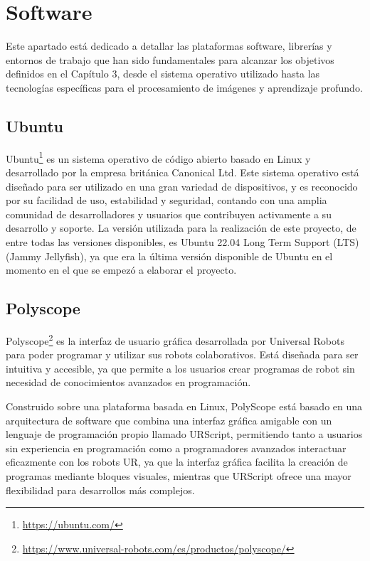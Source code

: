 \setcounter{footnote}{23} 

\section{Software}
\label{sec:software}

Este apartado está dedicado a detallar las plataformas software, librerías y entornos de trabajo que han sido fundamentales para alcanzar los objetivos definidos en el Capítulo 3, desde el sistema operativo utilizado hasta las tecnologías específicas para el procesamiento de imágenes y aprendizaje profundo.

\subsection{Ubuntu}
\label{sec:ubuntu}
Ubuntu\footnote{\url{https://ubuntu.com/}} es un sistema operativo de código abierto basado en Linux y desarrollado por la empresa británica Canonical Ltd. 
Este sistema operativo está diseñado para ser utilizado en una gran variedad de dispositivos, y es reconocido por su facilidad de uso, estabilidad y seguridad, contando con una amplia comunidad de desarrolladores y usuarios que contribuyen activamente a su desarrollo y soporte. La versión utilizada para la realización de este proyecto, de entre todas las versiones disponibles, es Ubuntu 22.04 Long Term Support (LTS) (Jammy Jellyfish), ya que era la última versión disponible de Ubuntu en el momento en el que se empezó a elaborar el proyecto. 

\subsection{Polyscope}
\label{sec:Polyscope}

Polyscope\footnote{\url{https://www.universal-robots.com/es/productos/polyscope/}} es la interfaz de usuario gráfica desarrollada por Universal Robots para poder programar y utilizar sus robots colaborativos. Está diseñada para ser intuitiva y accesible, ya que permite a los usuarios crear programas de robot sin necesidad de conocimientos avanzados en programación.

Construido sobre una plataforma basada en Linux, PolyScope está basado en una arquitectura de software que combina una interfaz gráfica amigable con un lenguaje de programación propio llamado URScript, permitiendo tanto a usuarios sin experiencia en programación como a programadores avanzados interactuar eficazmente con los robots UR, ya que la interfaz gráfica facilita la creación de programas mediante bloques visuales, mientras que URScript ofrece una mayor flexibilidad para desarrollos más complejos.

